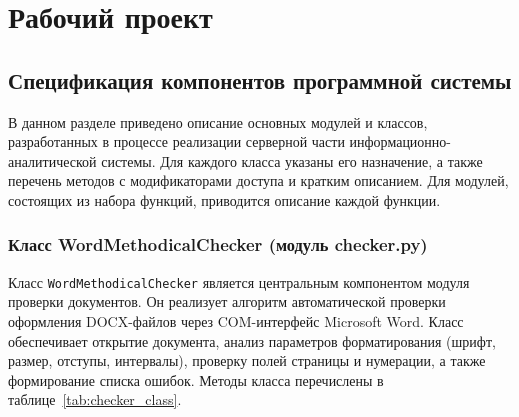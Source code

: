 \section{Рабочий проект}

\subsection{Спецификация компонентов программной системы}

В данном разделе приведено описание основных модулей и классов, разработанных в процессе реализации серверной части информационно-аналитической системы. Для каждого класса указаны его назначение, а также перечень методов с модификаторами доступа и кратким описанием. Для модулей, состоящих из набора функций, приводится описание каждой функции.

\subsubsection{Класс WordMethodicalChecker (модуль checker.py)}

Класс \texttt{WordMethodicalChecker} является центральным компонентом модуля проверки документов. Он реализует алгоритм автоматической проверки оформления DOCX-файлов через COM-интерфейс Microsoft Word. Класс обеспечивает открытие документа, анализ параметров форматирования (шрифт, размер, отступы, интервалы), проверку полей страницы и нумерации, а также формирование списка ошибок. Методы класса перечислены в таблице~\ref{tab:checker_class}.

